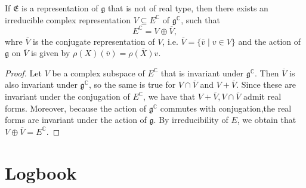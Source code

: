 \documentclass{report}
\begin{document}
\begin{proposition}
    If $\mathfrak E$ is a representation of $\mathfrak g$ that is not of real type, then there exists an irreducible complex representation $V \subseteq E^\mathbb C$ of $\mathfrak g^\mathbb C$, such that
    \[
    E^\mathbb C = V \oplus \overline V,
    \]
    whre $\overline V$ is the conjugate representation of $V$, i.e. $\overline V = \{ \overline v \mid v \in V \}$ and the action of $\mathfrak g$ on $\overline V$ is given by $\rho(X)(\overline v) = \overline{\rho(X)v}$.
\end{proposition}
\begin{proof}
    Let $V$ be a complex subspace of $E^\mathbb C$ that is invariant under $\mathfrak g^\mathbb C$.
    Then $\overline V$ is also invariant under $\mathfrak g^\mathbb C$, so the same is true for $V \cap \overline V$ and $V + \overline V$.
    Since these are invariant under the conjugation of $E^\mathbb C$, we have that $V + \overline V, V \cap \overline V$ admit real forms.
    Moreover, because the action of $\mathfrak g^\mathbb C$ commutes with conjugation,the real forms are invariant under the action of $\mathfrak g$.
    By irreducibility of $E$, we obtain that $V \oplus \overline V = E^\mathbb C$.
\end{proof}

\chapter{Logbook}
\setcounter{secnumdepth}{0}
\end{document}

